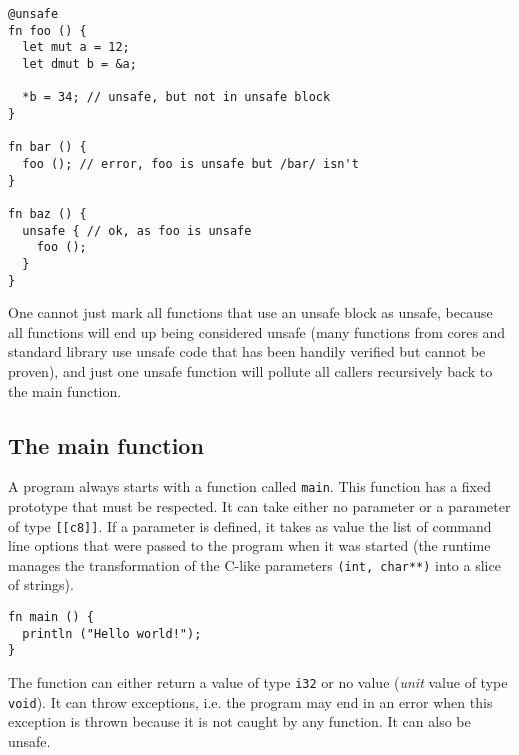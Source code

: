 
\begin{lstlisting}[style=coloredverbatim]
@unsafe
fn foo () {
  let mut a = 12;
  let dmut b = &a;

  *b = 34; // unsafe, but not in unsafe block
}

fn bar () {
  foo (); // error, foo is unsafe but /bar/ isn't
}

fn baz () {
  unsafe { // ok, as foo is unsafe
    foo ();
  }
}
\end{lstlisting}

One cannot just mark all functions that use an unsafe block as unsafe, because
all functions will end up being considered unsafe (many functions from cores and
standard library use unsafe code that has been handily verified but cannot be
proven), and just one unsafe function will pollute all callers recursively back
to the main function.

\subsection{The main function}

A program always starts with a function called \texttt{main}. This function has
a fixed prototype that must be respected. It can take either no parameter or a
parameter of type \texttt{[[c8]]}. If a parameter is defined, it takes as value
the list of command line options that were passed to the program when it was
started (the runtime manages the transformation of the C-like parameters
\texttt{(int, char**)} into a slice of strings).

\begin{lstlisting}[style=coloredverbatim, caption=The simplest main function]
fn main () {
  println ("Hello world!");
}
\end{lstlisting}

The function can either return a value of type \texttt{i32} or no value
(\textit{unit} value of type \texttt{void}). It can throw exceptions, i.e. the
program may end in an error when this exception is thrown because it is not
caught by any function. It can also be unsafe.

